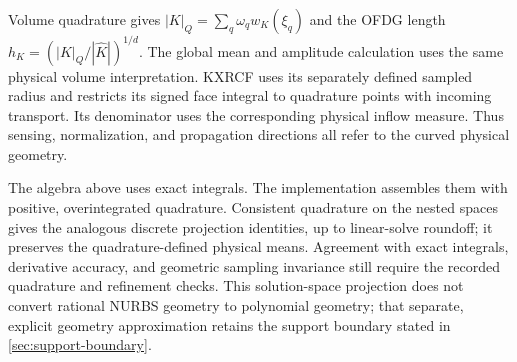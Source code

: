 Volume quadrature gives $|K|_Q=\sum_q\omega_qw_K(\xi_q)$ and the OFDG length
$h_K=(|K|_Q/|\widehat K|)^{1/d}$. The global mean and amplitude calculation
uses the same physical volume interpretation. KXRCF uses its separately defined
sampled radius and restricts its signed face integral to quadrature points
with incoming transport. Its denominator uses the corresponding physical
inflow measure. Thus sensing, normalization, and propagation directions all
refer to the curved physical geometry.

The algebra above uses exact integrals. The implementation assembles them
with positive, overintegrated quadrature. Consistent quadrature on the nested
spaces gives the analogous discrete projection identities, up to linear-solve
roundoff; it preserves the quadrature-defined physical means. Agreement with
exact integrals, derivative accuracy, and geometric sampling invariance still
require the recorded quadrature and refinement checks. This solution-space
projection does not convert rational NURBS geometry to polynomial geometry;
that separate, explicit geometry approximation retains the support boundary
stated in \cref{sec:support-boundary}.
